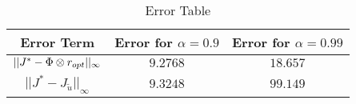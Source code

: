 \FloatBarrier
\begin{table}[H]
\begin{tabular}{|c|c|c|}\hline
Error Term & Error for $\alpha=0.9$ & Error for $\alpha=0.99$\\ \hline
$||J^*-\Phi\otimes r_{opt}||_\infty$ & $9.2768$ & $18.657$\\ \hline
$||J^*-J_{\tilde{u}}||_\infty$ & $9.3248$ & $99.149$\\ \hline
\end{tabular}
\caption{Error Table}
\label{errtable}
\end{table}

\begin{comment}
\begin{figure}
\begin{minipage}{0.45\textwidth}
\begin{tabular}{c}
\begin{tikzpicture}[scale=0.75]
    \begin{axis}[
	xlabel=State,
        ylabel=Discounted Cost,
	ymin=65,
	legend pos= south west,
	title={$\alpha=0.9$}
]
    \addplot[smooth,mark=.,blue] plot file {v_p9.dat};
    \addplot[dashed,mark=.,red] plot file {valp_p9.dat};
    \addplot[dotted,mark=.,black] plot file {valppol_p9.dat};
     \legend{$J^*$,$\tilde{J}=\Phi\om r_{opt}$, $J_{\tilde{u}}$}
    \end{axis}
    \end{tikzpicture}
\\

\begin{tikzpicture}[scale=0.75]
    \begin{axis}[
	xlabel=State,
        ylabel=Discounted Cost,
	legend pos=south west,
	title={$\alpha=0.99$}
]
    \addplot[smooth,mark=.,blue] plot file {v_p99.dat};
    \addplot[dashed,mark=.,red] plot file {valp_p99.dat};
    \addplot[dotted,mark=.,black] plot file {valppol_p99.dat};
     \legend{$J^*$,$\tilde{J}=\Phi\om r_{opt}$, $J_{\tilde{u}}$}
    \end{axis}
    \end{tikzpicture}
\end{tabular}
\end{minipage}
\caption{Optimal, Approximate and Greedy Policy Value Functions}
\label{Vapp}
\end{figure}
\end{comment}
